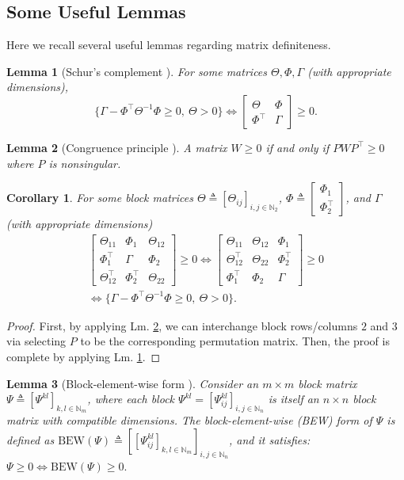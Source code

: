 \documentclass[letterpaper, 10 pt, conference]{ieeeconf}%
\newcommand{\N}{\mathbb{N}}
\newcommand{\T}{\top}
\newcommand{\0}{\mathbf{0}}
\newcommand{\bm}[1]{\begin{bmatrix}#1\end{bmatrix}}
\newtheorem{corollary}{\textbf{Corollary}}
\newtheorem{lemma}{\textbf{Lemma}}
\begin{document}
\subsection{Some Useful Lemmas} 
Here we recall several useful lemmas regarding matrix definiteness.

\begin{lemma} [Schur's complement \cite{Bernstein2009}] \label{Lm:SchursComplement}
For some matrices $\Theta, \Phi, \Gamma$ (with appropriate dimensions),  
$$
\{\Gamma-\Phi^\T \Theta^{-1} \Phi \geq 0,\ \Theta > 0\} \iff   
\bm{\Theta & \Phi \\ \Phi^\T & \Gamma} \geq 0.
$$
\end{lemma}

\begin{lemma} [Congruence principle \cite{Bernstein2009}] \label{Lm:Congruence}
A matrix $W \geq 0$ if and only if $P W P^\T \geq 0$ where $P$ is nonsingular.
\end{lemma}

\begin{corollary}\label{Co:SchurCongruence}
For some block matrices $\Theta \triangleq [\Theta_{ij}]_{i,j\in\N_2}$, $\Phi \triangleq \bm{\Phi_1 \\ \Phi_2^\T}$, and $\Gamma$ (with appropriate dimensions)    
\begin{align*}
\bm{\Theta_{11} & \Phi_{1} & \Theta_{12}\\ \Phi_1^\T & \Gamma & \Phi_2 \\ \Theta_{12}^\T & \Phi_2^\T & \Theta_{22}} \geq 0 
\iff \bm{\Theta_{11} & \Theta_{12} & \Phi_{1}  \\ \Theta_{12}^\T  & \Theta_{22} & \Phi_2^\T \\ \Phi_1^\T & \Phi_2 & \Gamma} \geq 0  \\
\iff \{\Gamma - \Phi^\T \Theta^{-1} \Phi \geq 0,\ \Theta > 0\}.
\end{align*}
\end{corollary}
\begin{proof}
First, by applying Lm. \ref{Lm:Congruence}, we can interchange block rows/columns $2$ and $3$ via selecting $P$ to be the corresponding permutation matrix. Then, the proof is complete by applying Lm. \ref{Lm:SchursComplement}. 
\end{proof}


\begin{lemma} [Block-element-wise form \cite{WelikalaJ22022}] \label{Lm:BEW}
Consider an $m\times m$ block matrix $\Psi \triangleq [\Psi^{kl}]_{k,l\in\N_m}$, where each block $\Psi^{kl}=[\Psi^{kl}_{ij}]_{i,j\in\N_n}$ is itself an $n \times n$ block matrix with compatible dimensions. The block-element-wise (BEW) form of $\Psi$ is defined as $\mathrm{BEW}(\Psi) \triangleq [[\Psi^{kl}_{ij}]_{k,l\in\N_m}]_{i,j\in\N_n}$, and it satisfies: 
$\Psi \geq 0  \iff \mathrm{BEW}(\Psi) \geq 0.$
\end{lemma}
\end{document}
